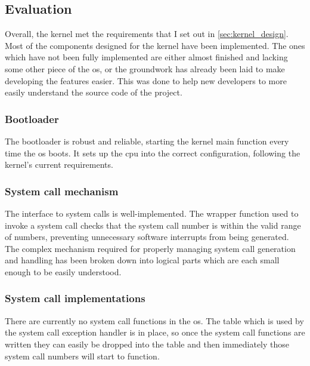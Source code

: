 \documentclass{article}
\begin{document}
\subsection{Evaluation}

Overall, the kernel met the requirements that I set out in
\autoref{sec:kernel_design}. Most of the components designed for the kernel
have been implemented. The ones which have not been fully implemented are
either almost finished and lacking some other piece of the \gls{os}, or the
groundwork has already been laid to make developing the features easier. This
was done to help new developers to more easily understand the source code of
the project.

\subsubsection{Bootloader}
The bootloader is robust and reliable, starting the kernel main function every
time the \gls{os} boots. It sets up the \gls{cpu} into the correct
configuration, following the kernel's current requirements.

\subsubsection{System call mechanism}
The interface to system calls is well-implemented. The wrapper function used to
invoke a system call checks that the system call number is within the valid
range of numbers, preventing unnecessary software interrupts from being
generated. The complex mechanism required for properly managing system call
generation and handling has been broken down into logical parts which are each
small enough to be easily understood.

\subsubsection{System call implementations}
\label{sec:eval_no_syscalls}
There are currently no system call functions in the \gls{os}. The table which
is used by the system call exception handler is in place, so once the system
call functions are written they can easily be dropped into the table and then
immediately those system call numbers will start to function.
\end{document}
